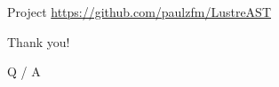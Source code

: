 \documentclass{beamer}
\begin{document}
\begin{frame}{Project}
    \url{https://github.com/paulzfm/LustreAST}
\end{frame}

\begin{frame}
    \begin{center}
        {\huge \color{blue!75}
            Thank you!

            Q / A
        }
    \end{center}
\end{frame}
\end{document}
